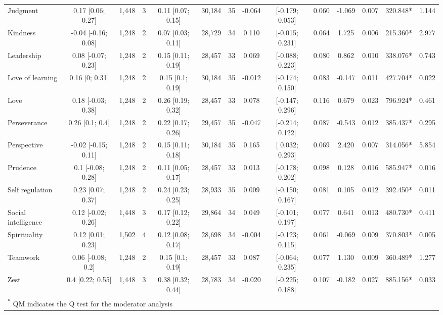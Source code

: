 \documentclass[
  man,floatsintext]{apa6}
\begin{document}
\begin{table}
{\begin{tabular}[t]{lccccccccccccc}
Judgment & 0.17 [0.06; 0.27] & 1,448 & 3 & 0.11 [0.07; 0.15] & 30,184 & 35 & -0.064 & {}[-0.179; 0.053] & 0.060 & -1.069 & 0.007 & 320.848* & 1.144\\
Kindness & -0.04 [-0.16; 0.08] & 1,248 & 2 & 0.07 [0.03; 0.11] & 28,729 & 34 & 0.110 & {}[-0.015; 0.231] & 0.064 & 1.725 & 0.006 & 215.360* & 2.977\\
Leadership & 0.08 [-0.07; 0.23] & 1,248 & 2 & 0.15 [0.11; 0.19] & 28,457 & 33 & 0.069 & {}[-0.088; 0.223] & 0.080 & 0.862 & 0.010 & 338.076* & 0.743\\
Love of learning & 0.16 [0; 0.31] & 1,248 & 2 & 0.15 [0.1; 0.19] & 30,184 & 35 & -0.012 & {}[-0.174; 0.150] & 0.083 & -0.147 & 0.011 & 427.704* & 0.022\\
\addlinespace
Love & 0.18 [-0.03; 0.38] & 1,248 & 2 & 0.26 [0.19; 0.32] & 28,457 & 33 & 0.078 & {}[-0.147; 0.296] & 0.116 & 0.679 & 0.023 & 796.924* & 0.461\\
Perseverance & 0.26 [0.1; 0.4] & 1,248 & 2 & 0.22 [0.17; 0.26] & 29,457 & 35 & -0.047 & {}[-0.214; 0.122] & 0.087 & -0.543 & 0.012 & 385.437* & 0.295\\
Perspective & -0.02 [-0.15; 0.11] & 1,248 & 2 & 0.15 [0.11; 0.18] & 30,184 & 35 & 0.165 & {}[ 0.032; 0.293] & 0.069 & 2.420 & 0.007 & 314.056* & 5.854\\
Prudence & 0.1 [-0.08; 0.28] & 1,248 & 2 & 0.11 [0.05; 0.17] & 28,457 & 33 & 0.013 & {}[-0.178; 0.202] & 0.098 & 0.128 & 0.016 & 585.947* & 0.016\\
Self regulation & 0.23 [0.07; 0.37] & 1,248 & 2 & 0.24 [0.23; 0.25] & 28,933 & 35 & 0.009 & {}[-0.150; 0.167] & 0.081 & 0.105 & 0.012 & 392.450* & 0.011\\
\addlinespace
Social intelligence & 0.12 [-0.02; 0.26] & 1,448 & 3 & 0.17 [0.12; 0.22] & 29,864 & 34 & 0.049 & {}[-0.101; 0.197] & 0.077 & 0.641 & 0.013 & 480.730* & 0.411\\
Spirituality & 0.12 [0.01; 0.23] & 1,502 & 4 & 0.12 [0.08; 0.17] & 28,698 & 34 & -0.004 & {}[-0.123; 0.115] & 0.061 & -0.069 & 0.009 & 370.803* & 0.005\\
Teamwork & 0.06 [-0.08; 0.2] & 1,248 & 2 & 0.15 [0.1; 0.19] & 28,457 & 33 & 0.087 & {}[-0.064; 0.235] & 0.077 & 1.130 & 0.009 & 360.489* & 1.277\\
Zest & 0.4 [0.22; 0.55] & 1,448 & 3 & 0.38 [0.32; 0.44] & 28,783 & 34 & -0.020 & {}[-0.225; 0.188] & 0.107 & -0.182 & 0.027 & 885.156* & 0.033\\
\bottomrule
\multicolumn{14}{l}{\textsuperscript{*} QM indicates the Q test for the moderator analysis}\\
\end{tabular}}
\end{table}
\end{document}
